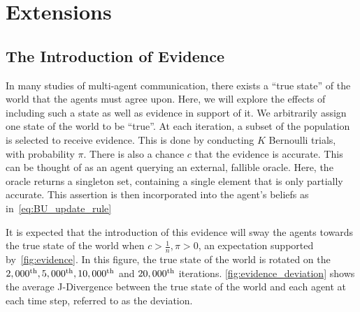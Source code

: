 \chapter{Extensions}

\section{The Introduction of Evidence} \label{sect:evidence}

In many studies of multi-agent communication, there exists a ``true state'' of the world that the agents must agree upon. Here, we will explore the effects of including such a state as well as evidence in support of it. We arbitrarily assign one state of the world to be ``true''. At each iteration, a subset of the population is selected to receive evidence. This is done by conducting $K$ Bernoulli trials, with probability $\pi$. There is also a chance $c$ that the evidence is accurate. This can be thought of as an agent querying an external, fallible oracle. Here, the oracle returns a singleton set, containing a single element that is only partially accurate. This assertion is then incorporated into the agent's beliefs as in~\cref{eq:BU_update_rule}

It is expected that the introduction of this evidence will sway the agents towards the true state of the world when $c > \frac{1}{n}, \pi > 0$, an expectation supported by~\cref{fig:evidence}. In this figure, the true state of the world is rotated on the $2,000^{\textnormal{th}},5,000^{\textnormal{th}},10,000^{\textnormal{th}} $ and $ 20,000^{\textnormal{th}}$ iterations. \cref{fig:evidence_deviation} shows the average J-Divergence between the true state of the world and each agent at each time step, referred to as the deviation. 


